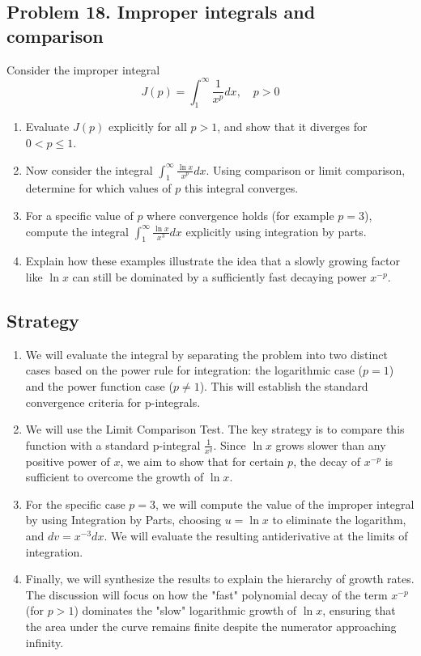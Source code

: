 \subsection{Problem 18. Improper integrals and comparison}
Consider the improper integral
\[J(p)=\displaystyle\int_{1}^{\infty}\frac{1}{x^{p}}dx, \quad p>0\]

\begin{enumerate}[label=(\alph*)]
    \item Evaluate $J(p)$ explicitly for all $p>1$, and show that it diverges for $0<p\le1$.
    \item Now consider the integral $\displaystyle\int_{1}^{\infty}\frac{\ln x}{x^{p}}dx$. Using comparison or limit comparison, determine for which values of $p$ this integral converges.
    \item For a specific value of $p$ where convergence holds (for example $p=3$), compute the integral $\displaystyle\int_{1}^{\infty}\frac{\ln x}{x^{3}}dx$ explicitly using integration by parts.
    \item Explain how these examples illustrate the idea that a slowly growing factor like $\ln x$ can still be dominated by a sufficiently fast decaying power $x^{-p}$.
\end{enumerate}

\subsection*{Strategy}
\begin{enumerate}[label=(\alph*)]
    \item We will evaluate the integral by separating the problem into two distinct cases based on the power rule for integration: the logarithmic case ($p=1$) and the power function case ($p \neq 1$). This will establish the standard convergence criteria for p-integrals.

    \item We will use the Limit Comparison Test. The key strategy is to compare this function with a standard p-integral $\frac{1}{x^q}$. Since $\ln x$ grows slower than any positive power of $x$, we aim to show that for certain $p$, the decay of $x^{-p}$ is sufficient to overcome the growth of $\ln x$.

    \item For the specific case $p=3$, we will compute the value of the improper integral by using Integration by Parts, choosing $u = \ln x$ to eliminate the logarithm, and $dv = x^{-3}dx$. We will evaluate the resulting antiderivative at the limits of integration.

    \item Finally, we will synthesize the results to explain the hierarchy of growth rates. The discussion will focus on how the "fast" polynomial decay of the term $x^{-p}$ (for $p>1$) dominates the "slow" logarithmic growth of $\ln x$, ensuring that the area under the curve remains finite despite the numerator approaching infinity.
\end{enumerate}

